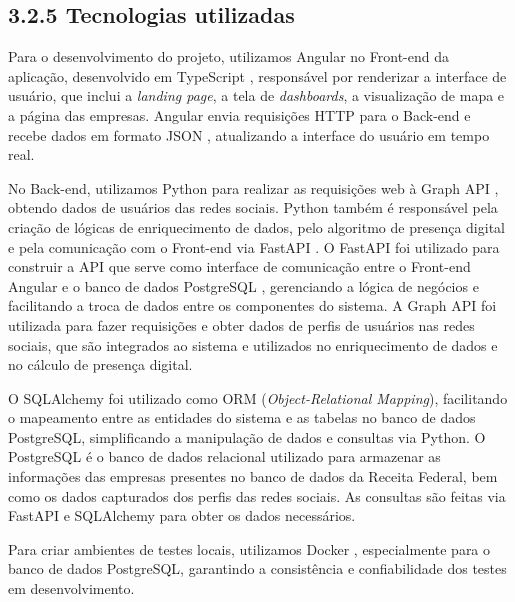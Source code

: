 \hypertarget{__RefHeading___Toc4781_3118176633}{}
\subsection*{3.2.5 Tecnologias utilizadas}
\label{ages-ii:text-h-0046}

Para o desenvolvimento do projeto, utilizamos Angular \cite{ages-ii-angular} no Front-end da aplicação, desenvolvido em TypeScript \cite{ages-ii-typescript}, responsável por renderizar a interface de usuário, que inclui a \textit{landing page}, a tela de \textit{dashboards}, a visualização de mapa e a página das empresas. Angular envia requisições HTTP \cite{ages-ii-http-rfc9110} para o Back-end e recebe dados em formato JSON \cite{ages-ii-json-rfc8259}, atualizando a interface do usuário em tempo real.

No Back-end, utilizamos Python \cite{ages-ii-python} para realizar as requisições web à Graph API \cite{ages-ii-graph-api}, obtendo dados de usuários das redes sociais. Python também é responsável pela criação de lógicas de enriquecimento de dados, pelo algoritmo de presença digital e pela comunicação com o Front-end via FastAPI \cite{ages-ii-fastapi}.
O FastAPI foi utilizado para construir a API que serve como interface de comunicação entre o Front-end Angular e o banco de dados PostgreSQL \cite{ages-iv-postgresql}, gerenciando a lógica de negócios e facilitando a troca de dados entre os componentes do sistema.
A Graph API foi utilizada para fazer requisições e obter dados de perfis de usuários nas redes sociais, que são integrados ao sistema e utilizados no enriquecimento de dados e no cálculo de presença digital.

O SQLAlchemy \cite{ages-ii-sqlalchemy} foi utilizado como ORM (\textit{Object-Relational Mapping}), facilitando o mapeamento entre as entidades do sistema e as tabelas no banco de dados PostgreSQL, simplificando a manipulação de dados e consultas via Python.
O PostgreSQL é o banco de dados relacional utilizado para armazenar as informações das empresas presentes no banco de dados da Receita Federal, bem como os dados capturados dos perfis das redes sociais. As consultas são feitas via FastAPI e SQLAlchemy para obter os dados necessários.

Para criar ambientes de testes locais, utilizamos Docker \cite{ages-iii-docker}, especialmente para o banco de dados PostgreSQL, garantindo a consistência e confiabilidade dos testes em desenvolvimento.

